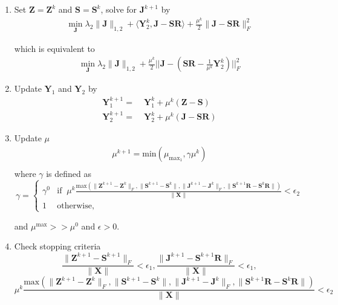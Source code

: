 \documentclass{article}
\begin{document}
\begin{enumerate}
\item Set $\mathbf Z = \mathbf Z^k$ and $\mathbf S = \mathbf S^k$, solve for $\mathbf J^{k+1}$ by
\begin{align*}
 \min_{\mathbf J} \lambda_2\|\mathbf J\|_{1,2} + \langle \mathbf Y^k_2, \mathbf J - \mathbf S\mathbf R\rangle +\frac{\mu^k}2\|\mathbf J - \mathbf S\mathbf R\|^2_F
\end{align*}

which is equivalent to
\begin{align*}
 \min_{\mathbf J} \lambda_2\|\mathbf J\|_{1,2} + \frac{\mu^k}{2}|| \mathbf J - (\mathbf S \mathbf R - \frac{1}{\mu^k} \mathbf Y^k_2)||^2_F
\end{align*}

\item Update $\mathbf Y_1$ and $\mathbf Y_2$ by
\begin{align*}
\mathbf Y^{k+1}_1 =& \; \mathbf Y^k_1 + \mu^k (\mathbf Z - \mathbf S) \\
\mathbf Y^{k+1}_2 =& \; \mathbf Y^k_2 + \mu^k (\mathbf J - \mathbf S \mathbf R)
\end{align*}

\item Update $\mu$
\begin{align*}
 \mu^{k+1} = \textrm{min}( \mu_{\text{max}_1}, \gamma \mu^k)\\
\end{align*}
where $\gamma$ is defined as
\[
\gamma = 
\begin{cases}
\gamma^0 & \text{if} \;\; \mu^k \frac{\textrm{max} ( \| \mathbf Z^{k+1} - \mathbf Z^{k}  \|_F  , \|  \mathbf S^{k+1} - \mathbf S^{k} \|, \| \mathbf J^{k+1} - \mathbf J^{k}  \|_F  , \|  \mathbf S^{k+1} \mathbf R - \mathbf S^{k} \mathbf R \|)}{\|\mathbf X \|} < \epsilon_2 \\
1 & \text{otherwise,}
\end{cases}
\]

and $\mu^{\text{max}} >>  \mu^0$ and $\epsilon > 0$.

\item Check stopping criteria
\[
\frac{\|\mathbf Z^{k+1} - \mathbf S^{k+1} \|_F}{\|\mathbf X \|} < \epsilon_1, \frac{\|\mathbf J^{k+1} - \mathbf S^{k+1} \mathbf R \|_F}{\|\mathbf X \|} < \epsilon_1,
\]
\[
\mu^k \frac{\textrm{max} ( \| \mathbf Z^{k+1} - \mathbf Z^{k}  \|_F  , \|  \mathbf S^{k+1} - \mathbf S^{k} \|, \| \mathbf J^{k+1} - \mathbf J^{k}  \|_F  , \|  \mathbf S^{k+1} \mathbf R - \mathbf S^{k} \mathbf R \|)}{\|\mathbf X \|} < \epsilon_2
\]

\end{enumerate}
\end{document}
